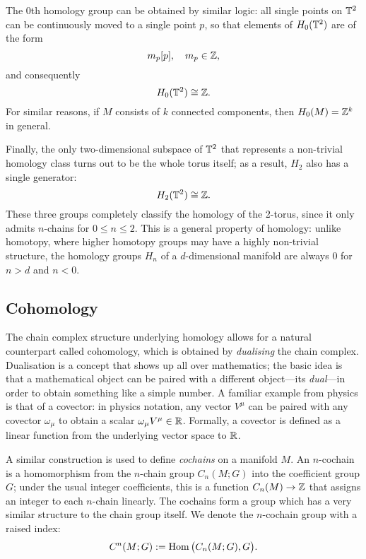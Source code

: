 The 0th homology group can be obtained by similar logic: all single points on $\mathbb{T}^2$ can be continuously moved to a single point $p$, so that elements of $H_0(\mathbb{T}^2)$ are of the form
\begin{equation*}
	m_p[p],\quad m_p\in\mathbb{Z},
\end{equation*}
and consequently
\begin{equation*}
	H_0(\mathbb{T}^2) \cong \mathbb{Z}.
\end{equation*}
For similar reasons, if $M$ consists of $k$ connected components, then $H_0(M) = \mathbb{Z}^k$ in general.

Finally, the only two-dimensional subspace of $\mathbb{T}^2$ that represents a non-trivial homology class turns out to be the whole torus itself; as a result, $H_2$ also has a single generator:
\begin{equation*}
	H_2(\mathbb{T}^2) \cong \mathbb{Z}.
\end{equation*}
These three groups completely classify the homology of the 2-torus, since it only admits $n$-chains for $0\leq n\leq 2$. This is a general property of homology: unlike homotopy, where higher homotopy groups may have a highly non-trivial structure, the homology groups $H_n$ of a $d$-dimensional manifold are always 0 for $n>d$ and $n<0$.


\subsection{Cohomology}\label{sec:cohomology}
The chain complex structure underlying homology allows for a natural counterpart called cohomology, which is obtained by \emph{dualising} the chain complex. Dualisation is a concept that shows up all over mathematics; the basic idea is that a mathematical object can be paired with a different object---its \emph{dual}---in order to obtain something like a simple number. A familiar example from physics is that of a covector: in physics notation, any vector $V^\mu$ can be paired with any covector $\omega_\mu$ to obtain a scalar $\omega_\mu V^\mu\in\mathbb{R}$. Formally, a covector is defined as a linear function from the underlying vector space to $\mathbb{R}$.

A similar construction is used to define \emph{cochains} on a manifold $M$. An $n$-cochain is a homomorphism from the $n$-chain group $C_n(M;G)$ into the coefficient group $G$; under the usual integer coefficients, this is a function $C_n(M)\to\mathbb{Z}$ that assigns an integer to each $n$-chain linearly. The cochains form a group which has a very similar structure to the chain group itself. We denote the $n$-cochain group with a raised index:
\begin{equation*}
	C^n(M;G) := \operatorname{Hom}\big(C_n(M;G),G\big).
\end{equation*}

